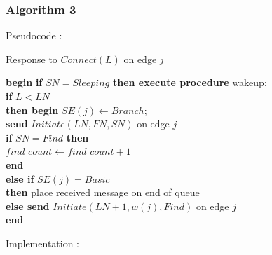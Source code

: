 \documentclass[letterpaper,11pt]{article}
\begin{document}
	\subsubsection{Algorithm 3}
	Pseudocode : \\
	
	\begin{tcolorbox}
		Response to $Connect(L)$ on edge $j$
		\begin{algorithmic}
			\STATE \textbf{begin} {\bf if} $SN = Sleeping$ {\bf then execute procedure }wakeup; \\
			{\quad \qquad  \bf if } $L < LN$ \\
			{\quad \qquad  \bf then begin } $SE(j) \leftarrow Branch$; \\
			{\qquad \qquad \qquad \qquad \bf send } $Initiate(LN, FN, SN)$ on edge $j$ \\
			{\qquad \qquad \qquad \qquad \bf if } $SN = Find$ {\bf then} \\
			{\qquad \qquad \qquad \qquad \quad } $find\_count \leftarrow find\_count + 1$ \\
			{\qquad \qquad  \qquad \bf end } \\
			{\quad \qquad  \bf else if } $SE(j) = Basic$ \\
			{\qquad \qquad \qquad \bf then } place received message on end of queue \\
			{\qquad \qquad \qquad \bf else send} $Initiate(LN+1, w(j), Find)$ on edge $j$ \\
			{\bf end}
		\end{algorithmic}
	\end{tcolorbox}
	
	\bigskip 
	
	Implementation : 
	
\end{document}
